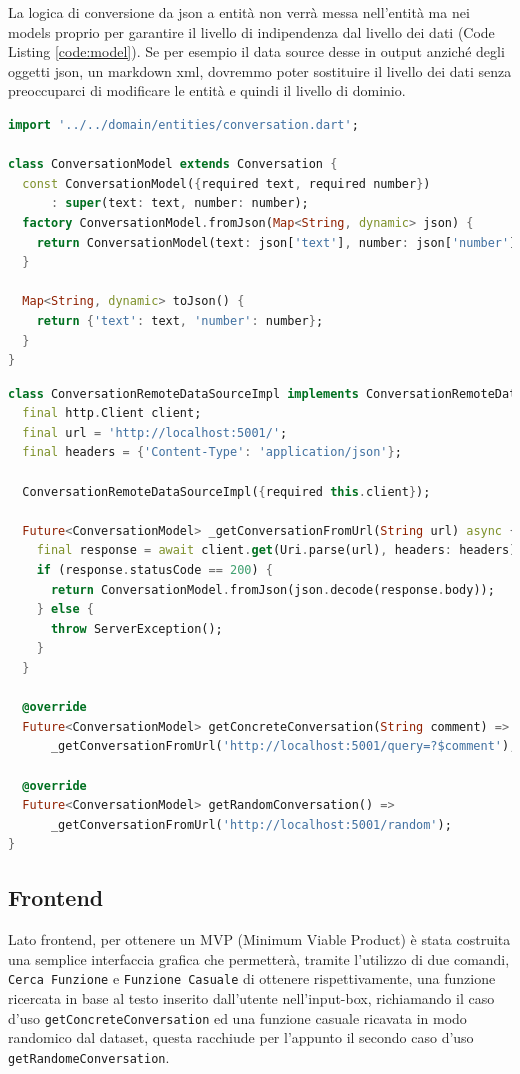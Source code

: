 La logica di conversione da json a entità non verrà messa nell'entità ma nei models proprio per garantire il livello di indipendenza dal livello dei dati (Code Listing  \ref{code:model}). Se per esempio il data source desse in output anziché degli oggetti json, un markdown xml, dovremmo poter sostituire il livello dei dati senza preoccuparci di modificare le entità e quindi il livello di dominio.
\newpage
\begin{lstlisting}[language=dart,caption=Data Layer:conversation\_model.dart,label=code:model] 
import '../../domain/entities/conversation.dart';

class ConversationModel extends Conversation {
  const ConversationModel({required text, required number})
      : super(text: text, number: number);
  factory ConversationModel.fromJson(Map<String, dynamic> json) {
    return ConversationModel(text: json['text'], number: json['number']);
  }

  Map<String, dynamic> toJson() {
    return {'text': text, 'number': number};
  }
}
\end{lstlisting}
\begin{lstlisting}[language=dart,caption=Data Layer: comversation\_remote\_data\_source\_impl.dart,label=code:conversationRemoteDataSourceImpl] 
class ConversationRemoteDataSourceImpl implements ConversationRemoteDataSource {
  final http.Client client;
  final url = 'http://localhost:5001/';
  final headers = {'Content-Type': 'application/json'};

  ConversationRemoteDataSourceImpl({required this.client});

  Future<ConversationModel> _getConversationFromUrl(String url) async {
    final response = await client.get(Uri.parse(url), headers: headers);
    if (response.statusCode == 200) {
      return ConversationModel.fromJson(json.decode(response.body));
    } else {
      throw ServerException();
    }
  }

  @override
  Future<ConversationModel> getConcreteConversation(String comment) =>
      _getConversationFromUrl('http://localhost:5001/query=?$comment');

  @override
  Future<ConversationModel> getRandomConversation() =>
      _getConversationFromUrl('http://localhost:5001/random');
}
\end{lstlisting}
\newpage
\subsection{Frontend}
Lato frontend, per ottenere un MVP (Minimum Viable Product) è stata costruita una semplice interfaccia grafica che permetterà, tramite l'utilizzo di due comandi, \texttt{Cerca Funzione} e \texttt{Funzione Casuale} di ottenere rispettivamente, una funzione ricercata in base al testo inserito dall'utente nell'input-box, richiamando il caso d'uso \texttt{getConcreteConversation} ed una funzione casuale ricavata in modo randomico dal dataset, questa racchiude per l'appunto il secondo caso d'uso \texttt{getRandomeConversation}.

